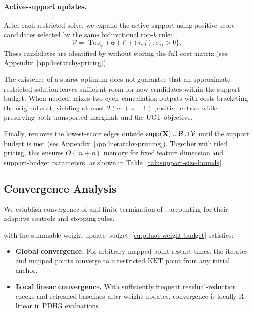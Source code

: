 \paragraph{Active-support updates.}
After each restricted solve, we expand the active support using positive-score candidates selected by the same bidirectional top-$k$ rule:
\begin{equation*}
\mathcal V=\operatorname{Top}_{\gamma}(\boldsymbol\sigma)\cap\{(i,j):\sigma_{ij}>0\}.
\end{equation*}
These candidates are identified by \pricing without storing the full cost matrix (see Appendix~\ref{app:hierarchy-pricing}).

The existence of a sparse optimum does not guarantee that an approximate restricted solution leaves sufficient room for new candidates within the support budget.
When needed, \sparsify mixes two cycle-cancellation outputs with costs bracketing the original cost, yielding at most $2(m+n-1)$ positive entries while preserving both transported marginals and the UOT objective.

Finally, \prune removes the lowest-score edges outside $\operatorname{supp}(\mathbf X)\cup\mathcal B\cup\mathcal V$ until the support budget is met (see Appendix~\ref{app:hierarchy-pruning}).
Together with tiled pricing, this ensures $O(m+n)$ memory for fixed feature dimension and support-budget parameters, as shown in Table~\ref{tab:support-size-bounds}.

\subsection{Convergence Analysis}
\label{sec:analysis}

We establish convergence of \subsolver and finite termination of \ours, accounting for their adaptive controls and stopping rules.


\begin{theorem}
\label{prop:pduot-convergence}
\subsolver with the summable weight-update budget~\eqref{eq:pduot-weight-budget} satisfies:
\begin{itemize}
\item \textbf{Global convergence.}
For arbitrary mapped-point restart times, the iterates and mapped points converge to a restricted KKT point from any initial anchor.
\item \textbf{Local linear convergence.}
With sufficiently frequent residual-reduction checks and refreshed baselines after weight updates, convergence is locally R-linear in PDHG evaluations.
\end{itemize}
\end{theorem}

